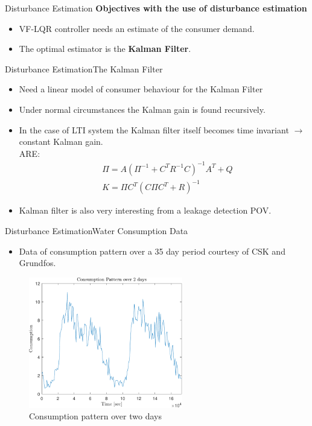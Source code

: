 \begin{frame}{Disturbance Estimation}
	 \textbf{Objectives with the use of disturbance estimation}
	 \begin{itemize}
	 	\item VF-LQR controller needs an estimate of the consumer demand.
	 	\item The optimal estimator is the \textbf{Kalman Filter}.
	 \end{itemize}
\end{frame}


\begin{frame}{Disturbance Estimation}{The Kalman Filter}
 	\begin{itemize}
 		\item Need a linear model of consumer behaviour for the Kalman Filter
 		\item Under normal circumstances the Kalman gain is found recursively.
 		\item In the case of LTI system the Kalman filter itself becomes time invariant $\rightarrow$ constant Kalman gain.\\
 		ARE:
 		\begin{equation}
 			\begin{split}\label{eq:ss_kalman_udledning4}
 				&\Pi = {A} (\Pi^{-1} + {C}^T {R}^{-1} {C})^{-1} {A}^T + {Q}\\
 				& K = \Pi {C}^T ({C} \Pi {C}^T + {R})^{-1}
 			\end{split}
 		\end{equation}
 		\item Kalman filter is also very interesting from a leakage detection POV.
 	\end{itemize}
\end{frame}


\begin{frame}{Disturbance Estimation}{Water Consumption Data}
	\begin{itemize}
		\item Data of consumption pattern over a 35 day period courtesy of CSK and Grundfos.  
	\end{itemize}
		 \begin{figure}[h!]
			\centering
			\includegraphics[width=0.6\textwidth]{Topics/KalmanEstimator/Graphics/ConsumptionPattern.pdf}
			\caption{Consumption pattern over two days}
			\label{fig:Consumption_Pattern}
		\end{figure}
\end{frame}

